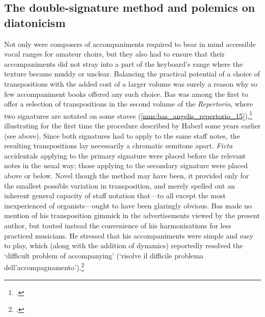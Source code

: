 \subsection{The double-signature method and polemics on diatonicism}
\label{sc:transpositions}%
Not only were composers of accompaniments required to bear in mind accessible vocal ranges for amateur choirs, but they also had to ensure that their accompaniments did not stray into a part of the keyboard's range where the texture became muddy or unclear.
Balancing the practical potential of a choice of transpositions with the added cost of a larger volume was surely a reason why so few accompaniment books offered any such choice.
Bas was among the first to offer a selection of transpositions in the second volume of the \emph{Repertorio}, where two signatures are notated on some staves (\cref{mus:bas_angelis_repertorio_15}),\footcite[15]{BasMissaAngelis1904} illustrating for the first time the procedure described by Haberl some years earlier (see  above).
Since both signatures had to apply to the same staff notes, the resulting transpositions lay necessarily a chromatic semitone apart.
\emph{Ficta} accidentals applying to the primary signature were placed before the relevant notes in the usual way; those applying to the secondary signature were placed above or below.
Novel though the method may have been, it provided only for the smallest possible variation in transposition, and merely spelled out an inherent general capacity of staff notation that---to all except the most inexperienced of organists---ought to have been glaringly obvious.
Bas made no mention of his transposition gimmick in the advertisements viewed by the present author, but touted instead the convenience of his harmonisations for less practiced musicians.
He stressed that his accompaniments were simple and easy to play, which (along with the addition of dynamics) reportedly resolved the `difficult problem of accompanying' (`risolve il difficile problema dell'accompagnamento').\footcite[col.~154]{Pubblicazionigregoriane1904}

